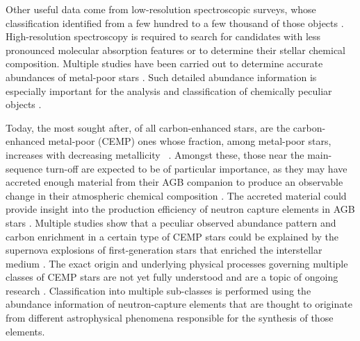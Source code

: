 Other useful data come from low-resolution spectroscopic surveys, whose classification identified from a few hundred to a few thousand of those objects \citep{2001A&A...375..366C, 2013ApJ...765...12G, 2013AJ....146..132L, 2016ApJS..226....1J, 2018ApJS..234...31L}. High-resolution spectroscopy is required to search for candidates with less pronounced molecular absorption features or to determine their stellar chemical composition. Multiple studies have been carried out to determine accurate abundances of metal-poor stars \citep{1997ApJ...488..350N, 2002ApJ...567.1166A, 2004A&A...416.1117C, 2005ESASP.560..433B, 2006AJ....132..137C, 2007ApJ...655..492A, 2007ApJ...670..774N, 2011ApJ...742...54H, 2013ApJ...762...26Y, 2014AJ....147..136R, 2015ApJ...807..173H, 2015ApJ...807..171J}. Such detailed abundance information is especially important for the analysis and classification of chemically peculiar objects \citep{2013ApJ...778...56C}.

Today, the most sought after, of all carbon-enhanced stars, are the carbon-enhanced metal-poor (CEMP) ones whose fraction, among metal-poor stars, increases with decreasing metallicity \Meh\ \citep{1992AJ....103.1987B, 1997ApJ...488..350N, 1999ASPC..165..264R, 2005ApJ...633L.109C, 2005ApJ...625..825L, 2005AJ....130.2804R, 2006ApJ...652.1585F, 2007PhDT........22M, 2012ApJ...744..195C, 2013AJ....146..132L, 2013ApJ...762...27Y,  2014ApJ...797...21P, 2018ApJ...861..146Y}. Amongst these, those near the main-sequence turn-off are expected to be of particular importance, as they may have accreted enough material from their AGB companion to produce an observable change in their atmospheric chemical composition \citep{2004ApJ...611..476S, 2014MNRAS.441.1217S, 2015ApJ...807..173H}. The accreted material could provide insight into the production efficiency of neutron capture elements in AGB stars \citep{2007ApJ...655..492A}. Multiple studies show that a peculiar observed abundance pattern and carbon enrichment in a certain type of CEMP stars could be explained by the supernova explosions of first-generation stars that enriched the interstellar medium \citep{2003Natur.422..871U, 2005ApJ...619..427U, 2014ApJ...785...98T, 2018MNRAS.tmp.2127B}. The exact origin and underlying physical processes governing multiple classes of CEMP stars are not yet fully understood and are a topic of ongoing research \citep{2014ApJ...788..180C, 2016ApJ...833...20Y, 2018MNRAS.475.4781C}. Classification into multiple sub-classes is performed using the abundance information of neutron-capture elements \citep{2005ARA&A..43..531B, 2013A&A...552A.107S, 2015ApJ...814..121H, 2016ApJ...833...20Y} that are thought to originate from different astrophysical phenomena responsible for the synthesis of those elements.

